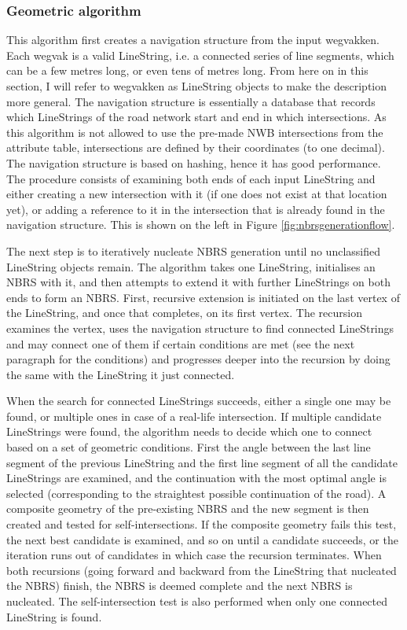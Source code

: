 \subsubsection{Geometric algorithm}

This algorithm first creates a navigation structure from the input wegvakken. Each wegvak is a valid LineString, i.e. a connected series of line segments, which can be a few metres long, or even tens of metres long. From here on in this section, I will refer to wegvakken as LineString objects to make the description more general. The navigation structure is essentially a database that records which LineStrings of the road network start and end in which intersections. As this algorithm is not allowed to use the pre-made NWB intersections from the attribute table, intersections are defined by their coordinates (to one decimal). The navigation structure is based on hashing, hence it has good performance. The procedure consists of examining both ends of each input LineString and either creating a new intersection with it (if one does not exist at that location yet), or adding a reference to it in the intersection that is already found in the navigation structure. This is shown on the left in Figure \ref{fig:nbrsgenerationflow}.

The next step is to iteratively nucleate NBRS generation until no unclassified LineString objects remain. The algorithm takes one LineString, initialises an NBRS with it, and then attempts to extend it with further LineStrings on both ends to form an NBRS. First, recursive extension is initiated on the last vertex of the LineString, and once that completes, on its first vertex. The recursion examines the vertex, uses the navigation structure to find connected LineStrings and may connect one of them if certain conditions are met (see the next paragraph for the conditions) and progresses deeper into the recursion by doing the same with the LineString it just connected.

When the search for connected LineStrings succeeds, either a single one may be found, or multiple ones in case of a real-life intersection. If multiple candidate LineStrings were found, the algorithm needs to decide which one to connect based on a set of geometric conditions. First the angle between the last line segment of the previous LineString and the first line segment of all the candidate LineStrings are examined, and the continuation with the most optimal angle is selected (corresponding to the straightest possible continuation of the road). A composite geometry of the pre-existing NBRS and the new segment is then created and tested for self-intersections. If the composite geometry fails this test, the next best candidate is examined, and so on until a candidate succeeds, or the iteration runs out of candidates in which case the recursion terminates. When both recursions (going forward and backward from the LineString that nucleated the NBRS) finish, the NBRS is deemed complete and the next NBRS is nucleated. The self-intersection test is also performed when only one connected LineString is found.

